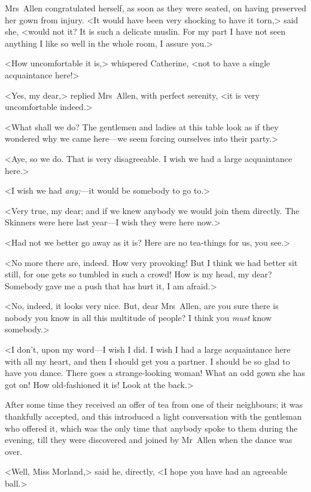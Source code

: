  Mrs~Allen congratulated herself, as soon as they were seated, on having preserved her gown from injury. <It would have been very shocking to have it torn,> said she, <would not it? It is such a delicate muslin. For my part I have not seen anything I like so well in the whole room, I assure you.> 

 <How uncomfortable it is,> whispered Catherine, <not to have a single acquaintance here!> 

 <Yes, my dear,> replied Mrs~Allen, with perfect serenity, <it is very uncomfortable indeed.> 

 <What shall we do? The gentlemen and ladies at this table look as if they wondered why we came here—we seem forcing ourselves into their party.> 

 <Aye, so we do. That is very disagreeable. I wish we had a large acquaintance here.> 

 <I wish we had \textit{any;}—it would be somebody to go to.> 

 <Very true, my dear; and if we knew anybody we would join them directly. The Skinners were here last year—I wish they were here now.> 

 <Had not we better go away as it is? Here are no tea-things for us, you see.> 

 <No more there are, indeed. How very provoking! But I think we had better sit still, for one gets so tumbled in such a crowd! How is my head, my dear? Somebody gave me a push that has hurt it, I am afraid.> 

 <No, indeed, it looks very nice. But, dear Mrs~Allen, are you sure there is nobody you know in all this multitude of people? I think you \textit{must} know somebody.> 

 <I don't, upon my word—I wish I did. I wish I had a large acquaintance here with all my heart, and then I should get you a partner. I should be so glad to have you dance. There goes a strange-looking woman! What an odd gown she has got on! How old-fashioned it is! Look at the back.> 

 After some time they received an offer of tea from one of their neighbours; it was thankfully accepted, and this introduced a light conversation with the gentleman who offered it, which was the only time that anybody spoke to them during the evening, till they were discovered and joined by Mr~Allen when the dance was over. 

 <Well, Miss Morland,> said he, directly, <I hope you have had an agreeable ball.> 

